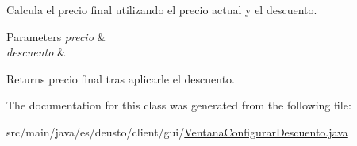 Calcula el precio final utilizando el precio actual y el descuento. 
\begin{DoxyParams}{Parameters}
{\em precio} & \\
\hline
{\em descuento} & \\
\hline
\end{DoxyParams}
\begin{DoxyReturn}{Returns}
precio final tras aplicarle el descuento. 
\end{DoxyReturn}


The documentation for this class was generated from the following file\+:\begin{DoxyCompactItemize}
\item 
src/main/java/es/deusto/client/gui/\mbox{\hyperlink{_ventana_configurar_descuento_8java}{Ventana\+Configurar\+Descuento.\+java}}\end{DoxyCompactItemize}
